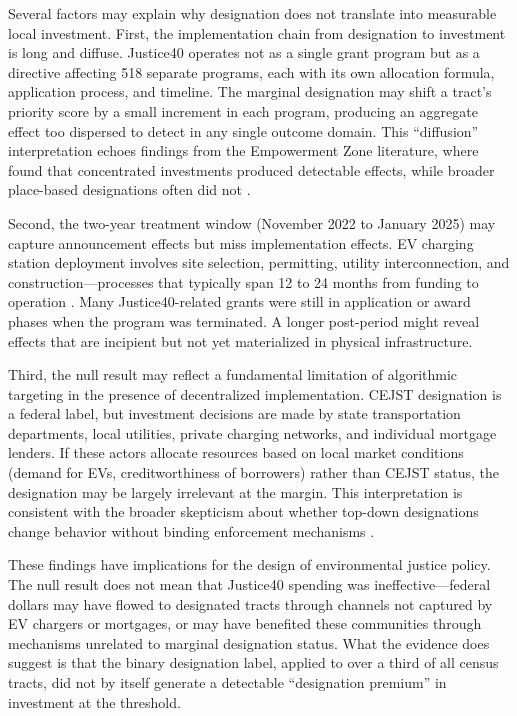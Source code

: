 \documentclass[12pt]{article}
\begin{document}
Several factors may explain why designation does not translate into measurable local investment. First, the implementation chain from designation to investment is long and diffuse. Justice40 operates not as a single grant program but as a directive affecting 518 separate programs, each with its own allocation formula, application process, and timeline. The marginal designation may shift a tract's priority score by a small increment in each program, producing an aggregate effect too dispersed to detect in any single outcome domain. This ``diffusion'' interpretation echoes findings from the Empowerment Zone literature, where \citet{busso2013assessing} found that concentrated investments produced detectable effects, while broader place-based designations often did not \citep{neumark2013enterprise}.

Second, the two-year treatment window (November 2022 to January 2025) may capture announcement effects but miss implementation effects. EV charging station deployment involves site selection, permitting, utility interconnection, and construction---processes that typically span 12 to 24 months from funding to operation \citep{springel2021network}. Many Justice40-related grants were still in application or award phases when the program was terminated. A longer post-period might reveal effects that are incipient but not yet materialized in physical infrastructure.

Third, the null result may reflect a fundamental limitation of algorithmic targeting in the presence of decentralized implementation. CEJST designation is a federal label, but investment decisions are made by state transportation departments, local utilities, private charging networks, and individual mortgage lenders. If these actors allocate resources based on local market conditions (demand for EVs, creditworthiness of borrowers) rather than CEJST status, the designation may be largely irrelevant at the margin. This interpretation is consistent with the broader skepticism about whether top-down designations change behavior without binding enforcement mechanisms \citep{kline2014people}.

These findings have implications for the design of environmental justice policy. The null result does not mean that Justice40 spending was ineffective---federal dollars may have flowed to designated tracts through channels not captured by EV chargers or mortgages, or may have benefited these communities through mechanisms unrelated to marginal designation status. What the evidence does suggest is that the binary designation label, applied to over a third of all census tracts, did not by itself generate a detectable ``designation premium'' in investment at the threshold.
\end{document}
